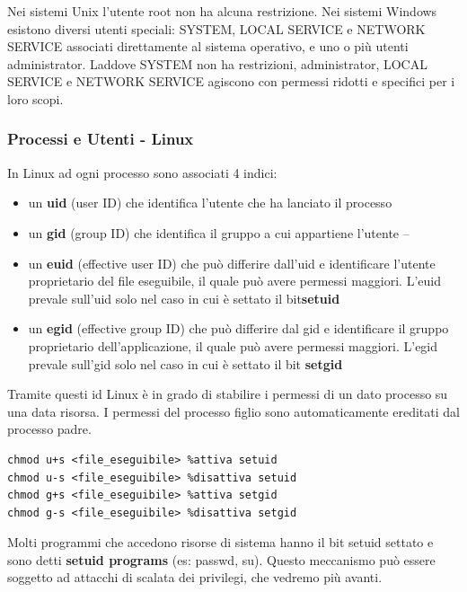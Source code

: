 Nei sistemi Unix l’utente root non ha alcuna restrizione. Nei sistemi Windows esistono diversi utenti speciali: SYSTEM, LOCAL SERVICE e NETWORK SERVICE associati direttamente al sistema operativo, e uno o più utenti administrator. Laddove SYSTEM non ha restrizioni, administrator, LOCAL SERVICE e NETWORK SERVICE agiscono con permessi ridotti e specifici per i loro scopi. 

\subsubsection{Processi e Utenti - Linux}
In Linux ad ogni processo sono associati 4 indici:
\begin{itemize}
  \item un \textbf{uid} (user ID) che identifica l’utente che ha lanciato il processo
  \item un \textbf{gid} (group ID) che identifica il gruppo a cui appartiene l'utente – 
  \item un \textbf{euid} (effective user ID) che può differire dall’uid e identificare l'utente proprietario del file eseguibile, il quale può avere permessi maggiori. L'euid prevale sull’uid solo nel caso in cui è settato il bit\textbf{setuid}
  \item un \textbf{egid} (effective group ID) che può differire dal gid e identificare il gruppo proprietario dell'applicazione, il quale può avere permessi maggiori. L'egid prevale sull’gid solo nel caso in cui è settato il bit \textbf{setgid}
\end{itemize}
Tramite questi id Linux è in grado di stabilire i permessi di un dato processo su una data risorsa. I permessi del processo figlio sono automaticamente ereditati dal processo padre.
\begin{algorithm}
\begin{lstlisting}[caption={Esempio forking in C}]
chmod u+s <file_eseguibile> %attiva setuid
chmod u-s <file_eseguibile> %disattiva setuid
chmod g+s <file_eseguibile> %attiva setgid
chmod g-s <file_eseguibile> %disattiva setgid
\end{lstlisting}
\end{algorithm}
Molti programmi che accedono risorse di sistema hanno il bit setuid settato e sono detti \textbf{setuid programs} (es: passwd, su). Questo meccanismo può essere soggetto ad attacchi di scalata dei privilegi, che vedremo più avanti. \newline \newline

